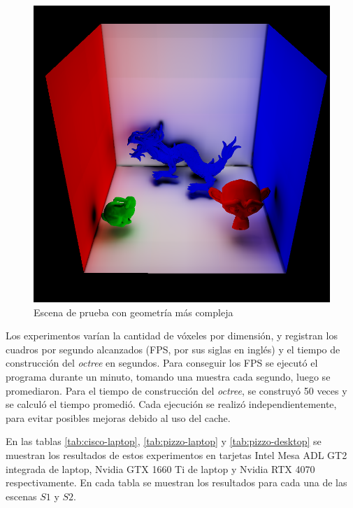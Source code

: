 \begin{figure}[ht]
	\centering
	\includegraphics[width=\textwidth]{complex-meshes.png}
	\caption{Escena de prueba con geometría más compleja}
	\label{fig:complex-meshes}
\end{figure}

Los experimentos varían la cantidad de vóxeles por dimensión, y registran los cuadros por segundo alcanzados (FPS, por sus siglas en inglés) y el tiempo de construcción del \textit{octree} en segundos.
Para conseguir los FPS se ejecutó el programa durante un minuto, tomando una muestra cada segundo, luego se promediaron.
Para el tiempo de construcción del \textit{octree}, se construyó 50 veces y se calculó el tiempo promedió.
Cada ejecución se realizó independientemente, para evitar posibles mejoras debido al uso del cache.

En las tablas \ref{tab:cisco-laptop}, \ref{tab:pizzo-laptop} y \ref{tab:pizzo-desktop} se muestran los resultados de estos experimentos en tarjetas Intel Mesa ADL GT2 integrada de laptop, Nvidia GTX 1660 Ti de laptop y Nvidia RTX 4070 respectivamente.
En cada tabla se muestran los resultados para cada una de las escenas $S1$ y $S2$.

